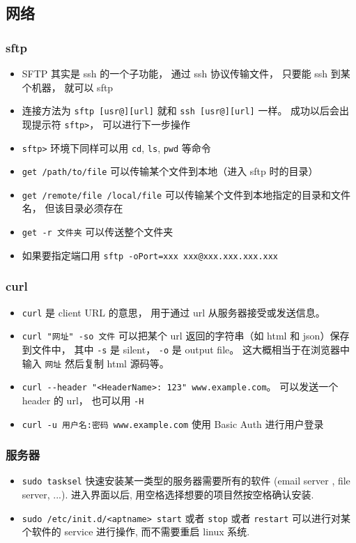 \subsection{网络}
\subsubsection{sftp}
\begin{itemize}
\item SFTP 其实是 ssh 的一个子功能， 通过 ssh 协议传输文件， 只要能 ssh 到某个机器， 就可以 sftp
\item 连接方法为 \verb`sftp [usr@][url]` 就和 \verb`ssh [usr@][url]` 一样。 成功以后会出现提示符 \verb`sftp>`， 可以进行下一步操作
\item \verb`sftp>` 环境下同样可以用 \verb`cd`, \verb`ls`, \verb`pwd` 等命令
\item \verb`get /path/to/file` 可以传输某个文件到本地（进入 sftp 时的目录）
\item \verb`get /remote/file /local/file` 可以传输某个文件到本地指定的目录和文件名， 但该目录必须存在
\item \verb`get -r 文件夹` 可以传送整个文件夹
\item 如果要指定端口用 \verb`sftp -oPort=xxx xxx@xxx.xxx.xxx.xxx`
\end{itemize}

\subsubsection{curl}
\begin{itemize}
\item \verb|curl| 是 client URL 的意思， 用于通过 url 从服务器接受或发送信息。
\item \verb|curl "网址" -so 文件| 可以把某个 url 返回的字符串（如 html 和 json）保存到文件中， 其中 \verb|-s| 是 silent， \verb|-o| 是 output file。 这大概相当于在浏览器中输入 \verb|网址| 然后复制 html 源码等。
\item \verb|curl --header "<HeaderName>: 123" www.example.com|。 可以发送一个 header 的 url， 也可以用 \verb|-H|
\item \verb|curl -u 用户名:密码 www.example.com| 使用 Basic Auth 进行用户登录
\end{itemize}

\subsubsection{服务器}
\begin{itemize}
\item \verb`sudo tasksel` 快速安装某一类型的服务器需要所有的软件 (email server , file server, ...). 进入界面以后, 用空格选择想要的项目然按空格确认安装.
\item \verb`sudo /etc/init.d/<aptname> start` 或者 \verb`stop` 或者 \verb`restart` 可以进行对某个软件的 service 进行操作, 而不需要重启 linux 系统.
\end{itemize}

